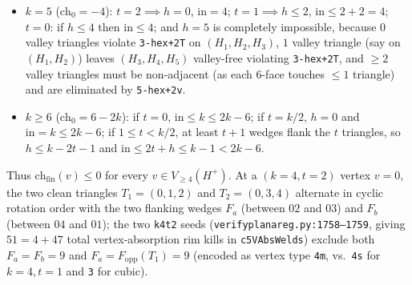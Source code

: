 \documentclass[11pt,reqno]{amsart}
\theoremstyle{plain}
\theoremstyle{definition}
\theoremstyle{remark}
\newcommand{\chz}{\mathrm{ch}_0}
\newcommand{\chf}{\mathrm{ch}_{\mathrm{fin}}}
\newcommand{\Vge}{V_{\ge 4}}
\DeclareRobustCommand{\_}{\ifmmode\text{\textunderscore}\else\textunderscore\allowbreak\fi}
\begin{document}
\begin{itemize}[leftmargin=1.8em]
\begin{itemize}[leftmargin=1.5em]
    \item $k = 5$ ($\chz = -4$): $t = 2 \implies h = 0$, $\mathrm{in} = 4$; $t = 1 \implies h \le 2$, $\mathrm{in} \le 2 + 2 = 4$; $t = 0$: if $h \le 4$ then $\mathrm{in} \le 4$; and $h = 5$ is completely impossible, because $0$ valley triangles violate \texttt{3-hex+2T} on $(H_1, H_2, H_3)$, $1$ valley triangle (say on $(H_1, H_2)$) leaves $(H_3, H_4, H_5)$ valley-free violating \texttt{3-hex+2T}, and $\ge 2$ valley triangles must be non-adjacent (as each $6$-face touches $\le 1$ triangle) and are eliminated by \texttt{5-hex+2v}.
    \item $k \ge 6$ ($\chz = 6 - 2k$): if $t = 0$, $\mathrm{in} \le k \le 2k - 6$; if $t = k/2$, $h = 0$ and $\mathrm{in} = k \le 2k - 6$; if $1 \le t < k/2$, at least $t + 1$ wedges flank the $t$ triangles, so $h \le k - 2t - 1$ and $\mathrm{in} \le 2t + h \le k - 1 < 2k - 6$.
  \end{itemize}
  Thus $\chf(v) \le 0$ for every $v \in \Vge(H^+)$. At a $(k=4, t=2)$ vertex $v = 0$, the two clean triangles $T_1 = (0, 1, 2)$ and $T_2 = (0, 3, 4)$ alternate in cyclic rotation order with the two flanking wedges $F_a$ (between $02$ and $03$) and $F_b$ (between $04$ and $01$); the two \texttt{k4t2} seeds (\texttt{verify\_planar\_eg.py:1758--1759}, giving $51 = 4 + 47$ total vertex-absorption rim kills in \texttt{c5VAbsWelds}) exclude both $F_a = F_b = 9$ and $F_a = F_{\mathrm{opp}}(T_1) = 9$ (encoded as vertex type \texttt{4m}, vs.\ \texttt{4s} for $k=4, t=1$ and \texttt{3} for cubic).


\end{itemize}
\end{document}
